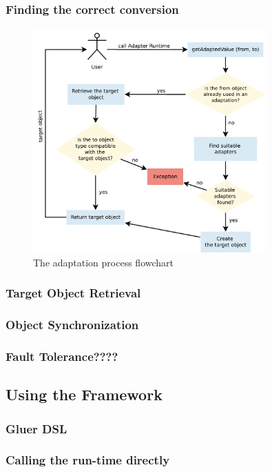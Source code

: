 \subsubsection{Finding the correct conversion}
\label{sec:adapter:find}
\begin{figure}[h]
\centering
\includegraphics[width=0.8\textwidth]{chapteradapters/adapterruntimeflow.pdf}
\caption{The adaptation process flowchart}
\label{fig:arflowchart}
\end{figure}

\subsubsection{Target Object Retrieval}
\subsubsection{Object Synchronization}
\label{sec:adapter:sync}
\subsubsection{Fault Tolerance????}

\subsection{Using the Framework}
\subsubsection{Gluer DSL}
\subsubsection{Calling the run-time directly}

